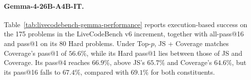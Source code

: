 \documentclass{article} %
\begin{document}
\paragraph{Gemma-4-26B-A4B-IT.}
Table~\ref{tab:livecodebench-gemma-performance} reports execution-based success on the 175 problems in the LiveCodeBench v6 increment, together with all-pass@16 and pass@1 on its 80 Hard problems.
Under Top-$p$, JS + Coverage matches Coverage's pass@1 of $56.6\%$, while its Hard pass@1 lies between those of JS and Coverage.
Its pass@4 reaches $66.9\%$, above JS's $65.7\%$ and Coverage's $64.6\%$, but its pass@16 falls to $67.4\%$, compared with $69.1\%$ for both constituents.

\begin{table}[!htbp]
\centering
\small
\setlength{\tabcolsep}{6pt}
\renewcommand{\arraystretch}{1.12}
\end{table}
\end{document}
